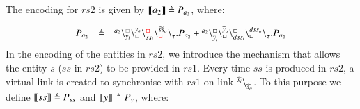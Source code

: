 \begin{example}
\[\begin{array}{lcl}
\end{array}
\]


%


\noindent
The encoding
for $rs2$ is given by $\llbracket a_2\rrbracket \triangleq P_{a_2}$, where:

\[
\begin{array}{lcl}
P_{a_2}&\defeq &\startchain{a_2}\chainedlink{y_i}{{\color{gray}\noact}}\chainedlink{{\color{gray}\noact}}{y_o}\chainedlink{\widetilde{ss}_i}{{\color{red}\noact}}\chainedlink{{\color{red}\noact}}{\widetilde{ss}_o}\chainend{\silent}.P_{a_2}+
\startchain{a_2}\chainedlink{\overline{y}_i}{\noact}\chainedlink{\noact}{\overline{y}_o}    
\chainedlink{dss_i}{\noact}\chainedlink{\noact}{dss_o}\chainend{\silent}.P_{a_2}\\
%
\end{array}
\]
\noindent
In the encoding
of the entities in  $rs2$, we introduce the mechanism that allows the entity
$s$ ($ss$ in $rs2$) to be provided in $rs1$. Every time $ss$ is produced in $rs2$,  a virtual link is
created to synchronise with $rs1$   on link ${}^{\widehat{s}_i} \backslash_{\widehat{s}_o}^{}$. 
To this purpose we define $\llbracket ss \rrbracket \triangleq P_{ss}$ and $\llbracket y\rrbracket\triangleq  P_{y}$, where:


\end{example}
